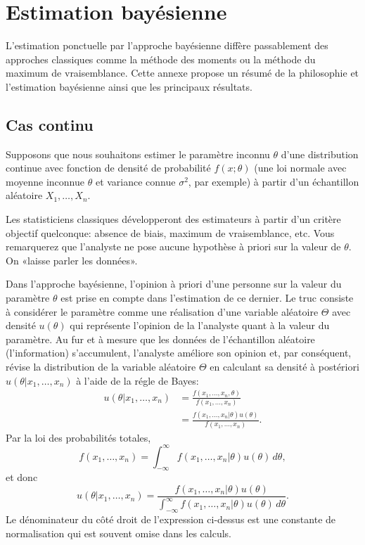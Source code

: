 \chapter{Estimation bayésienne}
\label{chap:estimation-bayesienne}

L'estimation ponctuelle par l'approche bayésienne diffère passablement
des approches classiques comme la méthode des moments ou la méthode du
maximum de vraisemblance. Cette annexe propose un résumé de la
philosophie et l'estimation bayésienne ainsi que les principaux
résultats.

\section{Cas continu}
\label{sec:estimation-bayesienne:continu}

Supposons que nous souhaitons estimer le paramètre inconnu $\theta$
d'une distribution continue avec fonction de densité de probabilité
$f(x;\theta)$ (une loi normale avec moyenne inconnue $\theta$ et
variance connue $\sigma^2$, par exemple) à partir d'un échantillon
aléatoire $X_1, \dots, X_n$.

Les statisticiens classiques développeront des estimateurs à partir
d'un critère objectif quelconque: absence de biais, maximum de
vraisemblance, etc. Vous remarquerez que l'analyste ne pose aucune
hypothèse à priori sur la valeur de $\theta$. On «laisse parler les
données».

Dans l'approche bayésienne, l'opinion à priori d'une personne sur la
valeur du paramètre $\theta$ est prise en compte dans l'estimation de
ce dernier. Le truc consiste à considérer le paramètre comme une
réalisation d'une variable aléatoire $\Theta$ avec densité $u(\theta)$
qui représente l'opinion de la l'analyste quant à la valeur du
paramètre. Au fur et à mesure que les données de l'échantillon
aléatoire (l'information) s'accumulent, l'analyste améliore son
opinion et, par conséquent, révise la distribution de la variable
aléatoire $\Theta$ en calculant sa densité à postériori
$u(\theta|x_1, \dots, x_n)$ à l'aide de la régle de Bayes:
\begin{align*}
  u(\theta|x_1, \dots, x_n)
  &= \frac{f(x_1, \dots, x_n, \theta)}{f(x_1, \dots, x_n)} \\
  &= \frac{f(x_1, \dots, x_n|\theta) u(\theta)}{f(x_1, \dots, x_n)}.
\end{align*}
Par la loi des probabilités totales,
\begin{equation*}
  f(x_1, \dots, x_n) =
  \int_{-\infty}^\infty f(x_1, \dots, x_n|\theta) u(\theta)\,d\theta,
\end{equation*}
et donc
\begin{equation*}
  u(\theta|x_1, \dots, x_n)
  = \frac{f(x_1, \dots, x_n|\theta) u(\theta)}
      {\int_{-\infty}^\infty f(x_1, \dots, x_n|\theta) u(\theta)\, d\theta}.
\end{equation*}
Le dénominateur du côté droit de l'expression ci-dessus est une
constante de normalisation qui est souvent omise dans les calculs.

